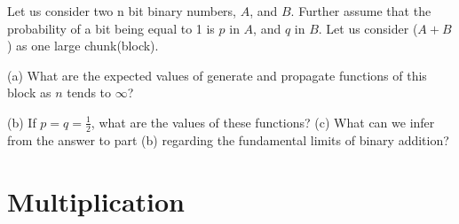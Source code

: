 \begin{ExerciseList}
\Exercise[difficulty=3]
Let us consider two n bit binary numbers, $A$, and $B$. Further
assume that the probability of a bit being equal to 1 is $p$ in $A$, and $q$ in $B$. Let
us consider ($A + B$) as one large chunk(block).

(a) What are the expected values of generate and propagate functions of this
block as $n$ tends to $\infty$?

(b) If $p = q = \frac{1}{2}$,
 what are the values of these functions?
(c) What can we infer from the answer to part (b) regarding the fundamental
limits of binary addition?
\end{ExerciseList}

\section*{Multiplication}

